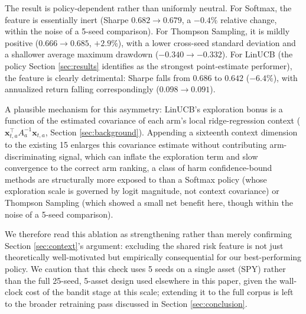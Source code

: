 \documentclass[pdflatex,sn-mathphys-num]{sn-jnl}
\theoremstyle{thmstyleone}%
\theoremstyle{thmstyletwo}%
\theoremstyle{thmstylethree}%
\begin{document}
\begin{appendices}
The result is policy-dependent rather than uniformly neutral. For Softmax, the feature is essentially inert (Sharpe $0.682 \to 0.679$, a $-0.4\%$ relative change, within the noise of a 5-seed comparison). For Thompson Sampling, it is mildly positive ($0.666 \to 0.685$, $+2.9\%$), with a lower cross-seed standard deviation and a shallower average maximum drawdown ($-0.340 \to -0.332$). For LinUCB (the policy Section \ref{sec:results} identifies as the strongest point-estimate performer), the feature is clearly detrimental: Sharpe falls from $0.686$ to $0.642$ ($-6.4\%$), with annualized return falling correspondingly ($0.098 \to 0.091$).

A plausible mechanism for this asymmetry: LinUCB's exploration bonus is a function of the estimated covariance of each arm's local ridge-regression context ($\mathbf{x}_{t,a}^\top A_a^{-1} \mathbf{x}_{t,a}$, Section \ref{sec:background}). Appending a sixteenth context dimension to the existing 15 enlarges this covariance estimate without contributing arm-discriminating signal, which can inflate the exploration term and slow convergence to the correct arm ranking, a class of harm confidence-bound methods are structurally more exposed to than a Softmax policy (whose exploration scale is governed by logit magnitude, not context covariance) or Thompson Sampling (which showed a small net benefit here, though within the noise of a 5-seed comparison).

We therefore read this ablation as strengthening rather than merely confirming Section \ref{sec:context}'s argument: excluding the shared risk feature is not just theoretically well-motivated but empirically consequential for our best-performing policy. We caution that this check uses 5 seeds on a single asset (SPY) rather than the full 25-seed, 5-asset design used elsewhere in this paper, given the wall-clock cost of the bandit stage at this scale; extending it to the full corpus is left to the broader retraining pass discussed in Section \ref{sec:conclusion}.

\end{appendices}
\end{document}
